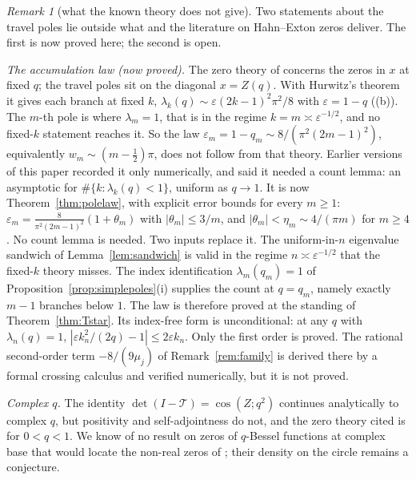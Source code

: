 \documentclass[11pt]{article}
\theoremstyle{plain}
\theoremstyle{definition}
\theoremstyle{remark}
\newtheorem{remark}[theorem]{Remark}
\begin{document}
\begin{remark}[what the known theory does not give]\label{rem:knowntheory}
Two statements about the travel poles lie outside what {\cite[Theorem ``the travel determinant'', \textup{thm:fredholm}]{Bonfioli2026bA}} and the
literature on Hahn--Exton zeros deliver. The first is now proved here; the second is open.

\emph{The accumulation law \textup{(}now proved\textup{)}.} The zero theory of
\cite{KoelinkSwarttouw1994,StampachStovicek2014} concerns the zeros in $x$ at fixed $q$; the travel
poles sit on the diagonal $x=Z(q)$. With Hurwitz's theorem it gives each branch at fixed $k$,
$\lambda_k(q)\sim\varepsilon(2k-1)^2\pi^2/8$ with $\varepsilon=1-q$
({\cite[Proposition ``infinitely many travel poles, without $T_2$'', \textup{prop:infpolesalt}]{Bonfioli2026bA}}\textup{(b)}). The $m$-th pole is where $\lambda_m=1$, that is
in the regime $k=m\asymp\varepsilon^{-1/2}$, and no fixed-$k$ statement reaches it. So the law
$\varepsilon_m=1-q_m\sim8/(\pi^2(2m-1)^2)$, equivalently $w_m\sim(m-\tfrac12)\pi$, does not follow
from that theory. Earlier versions of this paper recorded it only numerically, and said it needed a
count lemma: an asymptotic for $\#\{k:\lambda_k(q)<1\}$, uniform as $q\to1$. It is now
Theorem~\ref{thm:polelaw}, with explicit error bounds for every $m\ge1$:
$\varepsilon_m=\frac{8}{\pi^2(2m-1)^2}(1+\theta_m)$ with $|\theta_m|\le3/m$, and $|\theta_m|<\eta_m\sim4/(\pi m)$
for $m\ge4$. No count lemma is needed. Two inputs replace it. The uniform-in-$n$ eigenvalue sandwich
of Lemma~\ref{lem:sandwich} is valid in the regime $n\asymp\varepsilon^{-1/2}$ that the fixed-$k$
theory misses. The index identification $\lambda_m(q_m)=1$ of
Proposition~\ref{prop:simplepoles}\textup{(i)} supplies the count at $q=q_m$, namely exactly $m-1$
branches below $1$. The law is therefore proved at the standing of Theorem~\ref{thm:Tstar}. Its
index-free form is unconditional: at any $q$ with $\lambda_n(q)=1$,
$|\varepsilon k_n^2/(2q)-1|\le2\varepsilon k_n$. Only the first order is proved. The rational
second-order term $-8/(9\mu_j)$ of Remark~\ref{rem:family} is derived there by a formal crossing
calculus and verified numerically, but it is not proved.

\emph{Complex $q$.} The identity $\det(I-\mathcal T)=\cos(Z;q^2)$ continues analytically to complex
$q$, but positivity and self-adjointness do not, and the zero theory cited is for $0<q<1$. We know of
no result on zeros of $q$-Bessel functions at complex base that would locate the non-real zeros of
{\cite[Remark ``where on the circle the poles accumulate'', \textup{rem:polesdensity}]{Bonfioli2026bA}}; their density on the circle remains a conjecture.
\end{remark}
\end{document}
